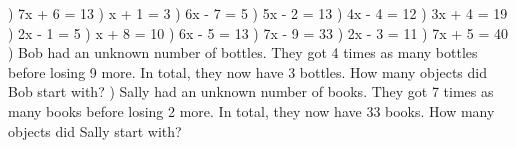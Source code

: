 \documentclass{article}%
\begin{document}
\newline%
\newline%
) 7x + 6 = 13%
\newline%
\newline%
) x + 1 = 3%
\newline%
\newline%
) 6x - 7 = 5%
\newline%
\newline%
) 5x - 2 = 13%
\newline%
\newline%
) 4x - 4 = 12%
\newline%
\newline%
) 3x + 4 = 19%
\newline%
\newline%
) 2x - 1 = 5%
\newline%
\newline%
) x + 8 = 10%
\newline%
\newline%
) 6x - 5 = 13%
\newline%
\newline%
) 7x - 9 = 33%
\newline%
\newline%
) 2x - 3 = 11%
\newline%
\newline%
) 7x + 5 = 40%
\newline%
\newline%
) Bob had an unknown number of bottles. They got 4 times as many bottles before losing 9 more. In total, they now have 3 bottles. How many objects did Bob start with?%
\newline%
\newline%
) Sally had an unknown number of books. They got 7 times as many books before losing 2 more. In total, they now have 33 books. How many objects did Sally start with?%
\end{document}

